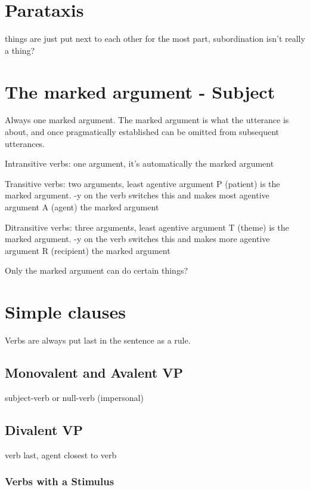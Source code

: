 \documentclass[smallroyalvopaper,9pt]{memoir}
\begin{document}
\section{Parataxis}

things are just put next to each other for the most part, subordination isn't really a thing?

\section{The marked argument - Subject}

Always one marked argument. The marked argument is what the utterance is about, and once pragmatically established can be omitted from subsequent utterances. 

Intransitive verbs: one argument, it's automatically the marked argument

Transitive verbs: two arguments, least agentive argument P (patient) is the marked argument. -y on the verb switches this and makes most agentive argument A (agent) the marked argument

Ditransitive verbs: three arguments, least agentive argument T (theme) is the marked argument. -y on the verb switches this and makes more agentive argument R (recipient) the marked argument

Only the marked argument can do certain things?

\section{Simple clauses}

Verbs are always put last in the sentence as a rule. 

\subsection{Monovalent and Avalent VP}

subject-verb or null-verb (impersonal)

\subsection{Divalent VP}

verb last, agent closest to verb

\subsubsection{Verbs with a Stimulus}
\end{document}
